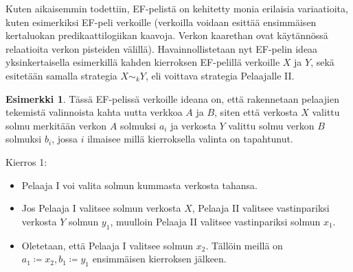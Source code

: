 \documentclass[finnish]{tktltiki2}
\theoremstyle{definition}
\newtheorem{esim}[lau]{Esimerkki}
\theoremstyle{remark}
\begin{document}
Kuten aikaisemmin todettiin, EF-pelistä on kehitetty monia erilaisia variaatioita, kuten esimerkiksi EF-peli verkoille (verkoilla voidaan esittää ensimmäisen kertaluokan predikaattilogiikan kaavoja. Verkon kaarethan ovat käytännössä relaatioita verkon pisteiden välillä). Havainnollistetaan nyt EF-pelin ideaa yksinkertaisella esimerkillä kahden kierroksen EF-pelillä verkoille $X$ ja $Y$, sekä esitetään samalla strategia $X \sim_k Y$, eli voittava strategia Pelaajalle II.

\begin{esim}
Tässä EF-pelissä verkoille ideana on, että rakennetaan pelaajien tekemistä valinnoista kahta uutta verkkoa $A$ ja $B$, siten että verkosta $X$ valittu solmu merkitään verkon $A$ solmuksi $a_i$ ja verkosta $Y$ valittu solmu verkon $B$ solmuksi $b_i$, jossa $i$ ilmaisee millä kierroksella valinta on tapahtunut.

\begin {center}
\end{center}


Kierros 1:
\begin{itemize}
  \item Pelaaja I voi valita solmun kummasta verkosta tahansa.
  \item Jos Pelaaja I valitsee solmun verkosta $X$, Pelaaja II valitsee vastinpariksi verkosta $Y$ solmun $y_1$, muulloin Pelaaja II valitsee vastinpariksi solmun $x_1$.
  \item Oletetaan, että Pelaaja I valitsee solmun $x_2$. Tällöin meillä on $a_1 \coloneqq x_2, b_1 \coloneqq y_1$ ensimmäisen kierroksen jälkeen.
\end{itemize}


\end{esim}
\end{document}
